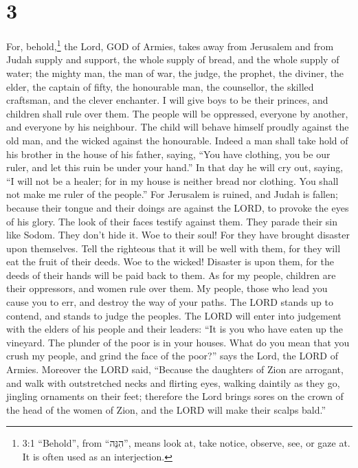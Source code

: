 \hypertarget{section-2}{%
\section{3}\label{section-2}}

 For, behold,\footnote{3:1 ``Behold'', from ``הִנֵּה'',
  means look at, take notice, observe, see, or gaze at. It is often used
  as an interjection.} the Lord, GOD of Armies, takes away from
Jerusalem and from Judah supply and support, the whole supply of bread,
and the whole supply of water;  the mighty man, the man of
war, the judge, the prophet, the diviner, the elder,  the
captain of fifty, the honourable man, the counsellor, the skilled
craftsman, and the clever enchanter.  I will give boys to be
their princes, and children shall rule over them.  The
people will be oppressed, everyone by another, and everyone by his
neighbour. The child will behave himself proudly against the old man,
and the wicked against the honourable.  Indeed a man shall
take hold of his brother in the house of his father, saying, ``You have
clothing, you be our ruler, and let this ruin be under your hand.''
 In that day he will cry out, saying, ``I will not be a
healer; for in my house is neither bread nor clothing. You shall not
make me ruler of the people.''  For Jerusalem is ruined, and
Judah is fallen; because their tongue and their doings are against the
LORD, to provoke the eyes of his glory.  The look of their
faces testify against them. They parade their sin like Sodom. They don't
hide it. Woe to their soul! For they have brought disaster upon
themselves.  Tell the righteous that it will be well with
them, for they will eat the fruit of their deeds.  Woe to
the wicked! Disaster is upon them, for the deeds of their hands will be
paid back to them.  As for my people, children are their
oppressors, and women rule over them. My people, those who lead you
cause you to err, and destroy the way of your paths.  The
LORD stands up to contend, and stands to judge the peoples.
 The LORD will enter into judgement with the elders of his
people and their leaders: ``It is you who have eaten up the vineyard.
The plunder of the poor is in your houses.  What do you
mean that you crush my people, and grind the face of the poor?'' says
the Lord, the LORD of Armies.  Moreover the LORD said,
``Because the daughters of Zion are arrogant, and walk with outstretched
necks and flirting eyes, walking daintily as they go, jingling ornaments
on their feet;  therefore the Lord brings sores on the
crown of the head of the women of Zion, and the LORD will make their
scalps bald.''

